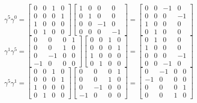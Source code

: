 $$
\gamma^{5} \gamma^{0}=\begin{bmatrix}
0 & 0 & 1 & 0 \\
0 & 0 & 0 & 1 \\
1 & 0 & 0 & 0 \\
0 & 1 & 0 & 0
\end{bmatrix}\begin{bmatrix}
1 & 0 & 0 & 0 \\
0 & 1 & 0 & 0 \\
0 & 0 & -1 & 0 \\
0 & 0 & 0 & -1
\end{bmatrix}=\begin{bmatrix}
0 & 0 & -1 & 0 \\
0 & 0 & 0 & -1 \\
1 & 0 & 0 & 0 \\
0 & 1 & 0 & 0
\end{bmatrix}
$$
$$
\gamma^{1} \gamma^{5}=\begin{bmatrix}
0 & 0 & 0 & 1 \\
0 & 0 & 1 & 0 \\
0 & -1 & 0 & 0 \\
-1 & 0 & 0 & 0
\end{bmatrix}\begin{bmatrix}
0 & 0 & 1 & 0 \\
0 & 0 & 0 & 1 \\
1 & 0 & 0 & 0 \\
0 & 1 & 0 & 0
\end{bmatrix}=\begin{bmatrix}
0 & 1 & 0 & 0 \\
1 & 0 & 0 & 0 \\
0 & 0 & 0 & -1 \\
0 & 0 & -1 & 0
\end{bmatrix}
$$
$$
\gamma^{5} \gamma^{1}=\begin{bmatrix}
0 & 0 & 1 & 0 \\
0 & 0 & 0 & 1 \\
1 & 0 & 0 & 0 \\
0 & 1 & 0 & 0
\end{bmatrix}\begin{bmatrix}
0 & 0 & 0 & 1 \\
0 & 0 & 1 & 0 \\
0 & -1 & 0 & 0 \\
-1 & 0 & 0 & 0
\end{bmatrix}=\begin{bmatrix}
0 & -1 & 0 & 0 \\
-1 & 0 & 0 & 0 \\
0 & 0 & 0 & 1 \\
0 & 0 & 1 & 0
\end{bmatrix}
$$
